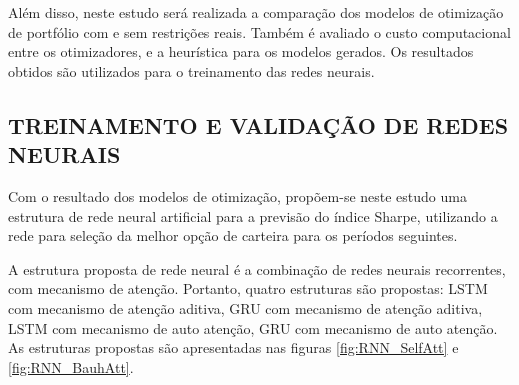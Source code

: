         \ipar Além disso, neste estudo será realizada a comparação dos modelos de otimização de portfólio com e sem restrições reais. Também é avaliado o custo computacional entre os otimizadores, e a heurística para os modelos gerados. Os resultados obtidos são utilizados para o treinamento das redes neurais.
        
    \subsection{TREINAMENTO E VALIDAÇÃO DE REDES NEURAIS}

        \ipar Com o resultado dos modelos de otimização, propõem-se neste estudo uma estrutura de rede neural artificial para a previsão do índice Sharpe, utilizando a rede para seleção da melhor opção de carteira para os períodos seguintes. 

        \ipar A estrutura proposta de rede neural é a combinação de redes neurais recorrentes, com mecanismo de atenção. Portanto, quatro estruturas são propostas: \acrshort{LSTM} com mecanismo de atenção aditiva, GRU com mecanismo de atenção aditiva, LSTM com mecanismo de auto atenção, GRU com mecanismo de auto atenção. As estruturas propostas são apresentadas nas figuras \ref{fig:RNN_SelfAtt} e  \ref{fig:RNN_BauhAtt}.


